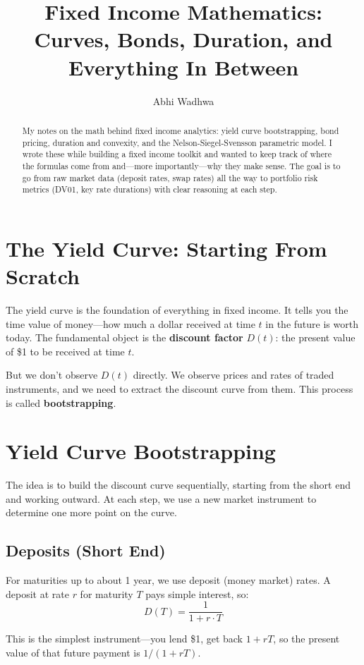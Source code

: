 \documentclass[11pt]{article}
\title{Fixed Income Mathematics:\\Curves, Bonds, Duration, and Everything In Between}
\author{Abhi Wadhwa}
\date{}
\begin{document}
\maketitle

\begin{abstract}
My notes on the math behind fixed income analytics: yield curve bootstrapping, bond pricing, duration and convexity, and the Nelson-Siegel-Svensson parametric model. I wrote these while building a fixed income toolkit and wanted to keep track of where the formulas come from and---more importantly---why they make sense. The goal is to go from raw market data (deposit rates, swap rates) all the way to portfolio risk metrics (DV01, key rate durations) with clear reasoning at each step.
\end{abstract}

\section{The Yield Curve: Starting From Scratch}

The yield curve is the foundation of everything in fixed income. It tells you the time value of money---how much a dollar received at time $t$ in the future is worth today. The fundamental object is the \textbf{discount factor} $D(t)$: the present value of \$1 to be received at time $t$.

But we don't observe $D(t)$ directly. We observe prices and rates of traded instruments, and we need to extract the discount curve from them. This process is called \textbf{bootstrapping}.

\section{Yield Curve Bootstrapping}

The idea is to build the discount curve sequentially, starting from the short end and working outward. At each step, we use a new market instrument to determine one more point on the curve.

\subsection{Deposits (Short End)}

For maturities up to about 1 year, we use deposit (money market) rates. A deposit at rate $r$ for maturity $T$ pays simple interest, so:
\[
D(T) = \frac{1}{1 + r \cdot T}
\]

This is the simplest instrument---you lend \$1, get back $1 + rT$, so the present value of that future payment is $1/(1+rT)$.
\end{document}

